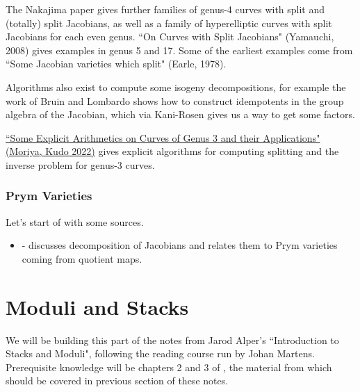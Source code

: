 \documentclass{article}
\begin{document}
The Nakajima paper gives further families of genus-4 curves with split and (totally) split Jacobians, as well as a family of hyperelliptic curves with split Jacobians for each even genus. ``On Curves with Split Jacobians" (Yamauchi, 2008) gives examples in genus 5 and 17. Some of the earliest examples come from ``Some Jacobian varieties which split" (Earle, 1978). 


Algorithms also exist to compute some isogeny decompositions, for example the work of Bruin and Lombardo shows how to construct idempotents in the group algebra of the Jacobian, which via Kani-Rosen gives us a way to get some factors. 

\href{https://arxiv.org/abs/2209.02926}{``Some Explicit Arithmetics on Curves of Genus 3 and their Applications" (Moriya, Kudo 2022)} gives explicit algorithms for computing splitting and the inverse problem for genus-3 curves. 

\section{Prym Varieties}

Let's start of with some sources.
\begin{itemize}
	\item \cite{Reyes2019} - discusses decomposition of Jacobians and relates them to Prym varieties coming from quotient maps. 
\end{itemize}


\part{Moduli and Stacks}
We will be building this part of the notes from Jarod Alper's ``Introduction to Stacks and Moduli", following the reading course run by Johan Martens. Prerequisite knowledge will be chapters 2 and 3 of \cite{Hartshorne1977}, the material from which should be covered in previous section of these notes. 





\end{document}
